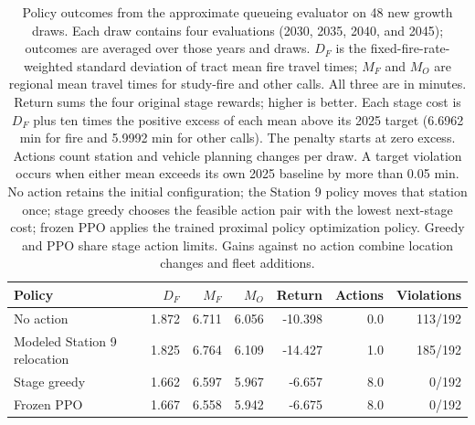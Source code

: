 \begin{table}[htbp]
\centering
\small
\caption{Policy outcomes from the approximate queueing evaluator on 48 new growth draws. Each draw contains four evaluations (2030, 2035, 2040, and 2045); outcomes are averaged over those years and draws. $D_F$ is the fixed-fire-rate-weighted standard deviation of tract mean fire travel times; $M_F$ and $M_O$ are regional mean travel times for study-fire and other calls. All three are in minutes. Return sums the four original stage rewards; higher is better. Each stage cost is $D_F$ plus ten times the positive excess of each mean above its 2025 target (6.6962 min for fire and 5.9992 min for other calls). The penalty starts at zero excess. Actions count station and vehicle planning changes per draw. A target violation occurs when either mean exceeds its own 2025 baseline by more than 0.05 min. No action retains the initial configuration; the Station 9 policy moves that station once; stage greedy chooses the feasible action pair with the lowest next-stage cost; frozen PPO applies the trained proximal policy optimization policy. Greedy and PPO share stage action limits. Gains against no action combine location changes and fleet additions.}
\label{tab:fast_policy_levels}
\setlength{\tabcolsep}{4pt}
\begin{tabular}{lrrrrrr}
\toprule
Policy & $D_F$ & $M_F$ & $M_O$ & Return & Actions & Violations \\
\midrule
No action & 1.872 & 6.711 & 6.056 & -10.398 & 0.0 & 113/192 \\
Modeled Station 9 relocation & 1.825 & 6.764 & 6.109 & -14.427 & 1.0 & 185/192 \\
Stage greedy & 1.662 & 6.597 & 5.967 & -6.657 & 8.0 & 0/192 \\
Frozen PPO & 1.667 & 6.558 & 5.942 & -6.675 & 8.0 & 0/192 \\
\bottomrule
\end{tabular}
\end{table}
